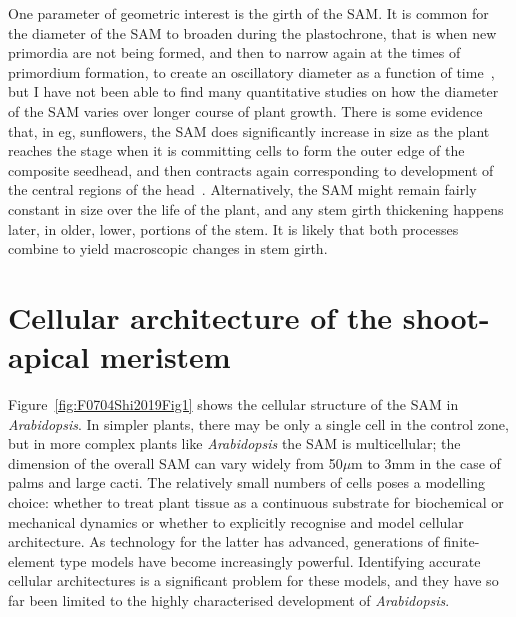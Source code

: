  One parameter of geometric interest is the girth of the SAM.  It is common for the diameter of the SAM to broaden during the plastochrone, that is when new primordia are not being formed, and then to narrow again at the times of primordium formation, to create an oscillatory diameter as a function of time~\autocite{cronkMolecularOrganographyPlants2009}, but I have not been able to find many quantitative studies on how the diameter of the SAM varies over longer course of plant growth. There is some evidence that, in eg, sunflowers, the SAM does significantly increase in size as the plant reaches the stage when it is committing cells to form the outer edge of the composite seedhead, and then contracts again  corresponding to development of the central regions of the head~\cite{palmerPhysiologicalBasisPattern1998}. Alternatively, the SAM might remain fairly constant in size over the life of the plant, and any stem girth thickening happens later, in older,  lower, portions of the stem. It is likely that both processes combine to yield  macroscopic changes in stem girth. 
 

\section{Cellular architecture of the shoot-apical meristem}
Figure~\ref{fig:F0704Shi2019Fig1} shows the cellular structure of the SAM in \textit{Arabidopsis}.  In simpler plants, there may be only a single cell in the control zone, but in more complex plants like \textit{Arabidopsis} the SAM is multicellular; the dimension of the overall SAM can vary widely from 50$\mu$m to 3mm in the case of palms and large cacti. The relatively small numbers of cells poses a modelling choice: whether to treat  plant tissue as a continuous substrate for biochemical or mechanical dynamics or whether to explicitly recognise and model cellular architecture. As technology for the latter has advanced, generations of finite-element type models have become increasingly powerful. Identifying accurate cellular architectures is a significant problem for these models, and they have so far been limited to the highly characterised development of \textit{Arabidopsis}. 
 

